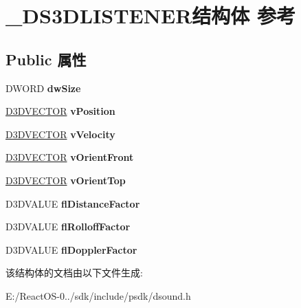 \hypertarget{struct___d_s3_d_l_i_s_t_e_n_e_r}{}\section{\+\_\+\+D\+S3\+D\+L\+I\+S\+T\+E\+N\+E\+R结构体 参考}
\label{struct___d_s3_d_l_i_s_t_e_n_e_r}
\subsection*{Public 属性}
\begin{DoxyCompactItemize}
\item 
\mbox{\label{struct___d_s3_d_l_i_s_t_e_n_e_r_a32d153579c8d29c7c68b0ab997fd0629}} 
D\+W\+O\+RD {\bfseries dw\+Size}
\item 
\mbox{\label{struct___d_s3_d_l_i_s_t_e_n_e_r_ac88ff0305e916409bed21506da13a99d}} 
\hyperlink{struct___d3_d_v_e_c_t_o_r}{D3\+D\+V\+E\+C\+T\+OR} {\bfseries v\+Position}
\item 
\mbox{\label{struct___d_s3_d_l_i_s_t_e_n_e_r_a4ebf7c607c8195c895a22f8c8c84cbfd}} 
\hyperlink{struct___d3_d_v_e_c_t_o_r}{D3\+D\+V\+E\+C\+T\+OR} {\bfseries v\+Velocity}
\item 
\mbox{\label{struct___d_s3_d_l_i_s_t_e_n_e_r_ae67e07db8303f24b60cf24eb0e365222}} 
\hyperlink{struct___d3_d_v_e_c_t_o_r}{D3\+D\+V\+E\+C\+T\+OR} {\bfseries v\+Orient\+Front}
\item 
\mbox{\label{struct___d_s3_d_l_i_s_t_e_n_e_r_a237765de15f0a79654b87c80abd206fe}} 
\hyperlink{struct___d3_d_v_e_c_t_o_r}{D3\+D\+V\+E\+C\+T\+OR} {\bfseries v\+Orient\+Top}
\item 
\mbox{\label{struct___d_s3_d_l_i_s_t_e_n_e_r_a9262aa7e1e613bbca208bea26c2de22b}} 
D3\+D\+V\+A\+L\+UE {\bfseries fl\+Distance\+Factor}
\item 
\mbox{\label{struct___d_s3_d_l_i_s_t_e_n_e_r_a6e9664933efc10cf7a02d7699c935da6}} 
D3\+D\+V\+A\+L\+UE {\bfseries fl\+Rolloff\+Factor}
\item 
\mbox{\label{struct___d_s3_d_l_i_s_t_e_n_e_r_a352554d04e078f09775ced09ee585958}} 
D3\+D\+V\+A\+L\+UE {\bfseries fl\+Doppler\+Factor}
\end{DoxyCompactItemize}


该结构体的文档由以下文件生成\+:\begin{DoxyCompactItemize}
\item 
E\+:/\+React\+O\+S-\/0../sdk/include/psdk/dsound.\+h\end{DoxyCompactItemize}
